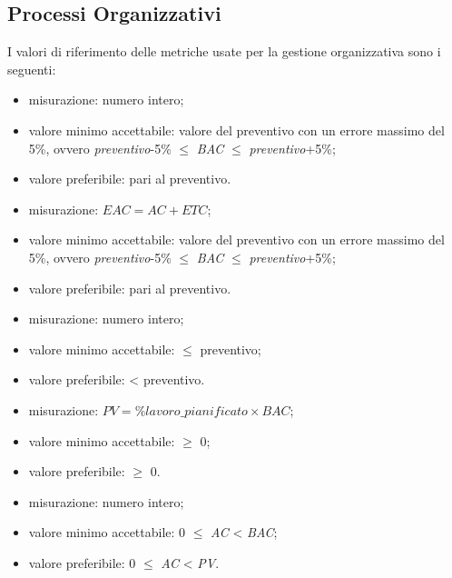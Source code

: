 \subsection{Processi Organizzativi}

	I valori di riferimento delle metriche usate per la gestione organizzativa sono i seguenti:
	
			\begin{itemize}
				\item{misurazione: numero intero;}
				\item{valore minimo accettabile: valore del preventivo con un errore massimo del 5\%, ovvero \textit{preventivo}-5\% $\leq$ \textit{BAC} $\leq$ \textit{preventivo}+5\%;}
				\item{valore preferibile: pari al preventivo.}
			\end{itemize}
		
			\begin{itemize}
				\item{misurazione: $EAC = AC + ETC$;}
				\item{valore minimo accettabile: valore del preventivo con un errore massimo del 5\%, ovvero \textit{preventivo}-5\% $\leq$ \textit{BAC} $\leq$ \textit{preventivo}+5\%;}
				\item{valore preferibile: pari al preventivo.}
			\end{itemize}
		
			\begin{itemize}
				\item{misurazione: numero intero;}
				\item{valore minimo accettabile: $\leq$ preventivo;}
				\item{valore preferibile: < preventivo.}
			\end{itemize}
		
			\begin{itemize}
				\item{misurazione: $PV = \%lavoro\_pianificato \times BAC$;}
				\item{valore minimo accettabile: $\geq$ 0;}
				\item{valore preferibile: $\geq$ 0.}
			\end{itemize}
		
			\begin{itemize}
				\item{misurazione: numero intero;}
				\item{valore minimo accettabile: 0 $\leq$ \textit{AC} < \textit{BAC};}
				\item{valore preferibile: 0 $\leq$ \textit{AC} < \textit{PV}.}
			\end{itemize}
		
